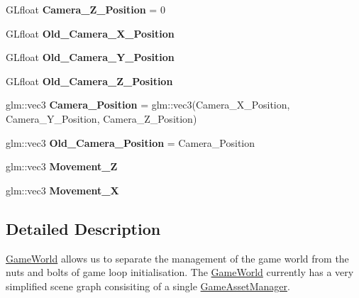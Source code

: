 \begin{DoxyCompactItemize}
\item 
\hypertarget{class_game_world_ad993ea24fbacfc98410894078e916927}{}G\+Lfloat {\bfseries Camera\+\_\+\+Z\+\_\+\+Position} = 0\label{class_game_world_ad993ea24fbacfc98410894078e916927}

\item 
\hypertarget{class_game_world_a734c19bd480aef2a7af005e170d3d523}{}G\+Lfloat {\bfseries Old\+\_\+\+Camera\+\_\+\+X\+\_\+\+Position}\label{class_game_world_a734c19bd480aef2a7af005e170d3d523}

\item 
\hypertarget{class_game_world_ac1c9de2db7cb175f7a039a9f825190fc}{}G\+Lfloat {\bfseries Old\+\_\+\+Camera\+\_\+\+Y\+\_\+\+Position}\label{class_game_world_ac1c9de2db7cb175f7a039a9f825190fc}

\item 
\hypertarget{class_game_world_acf69fc81410f4bb31d03b7551eb0bced}{}G\+Lfloat {\bfseries Old\+\_\+\+Camera\+\_\+\+Z\+\_\+\+Position}\label{class_game_world_acf69fc81410f4bb31d03b7551eb0bced}

\item 
\hypertarget{class_game_world_ad80e597474ea4c52a583e81788187571}{}glm\+::vec3 {\bfseries Camera\+\_\+\+Position} = glm\+::vec3(Camera\+\_\+\+X\+\_\+\+Position, Camera\+\_\+\+Y\+\_\+\+Position, Camera\+\_\+\+Z\+\_\+\+Position)\label{class_game_world_ad80e597474ea4c52a583e81788187571}

\item 
\hypertarget{class_game_world_ade0aa1baaba6ac54674638cef313c0bb}{}glm\+::vec3 {\bfseries Old\+\_\+\+Camera\+\_\+\+Position} = Camera\+\_\+\+Position\label{class_game_world_ade0aa1baaba6ac54674638cef313c0bb}

\item 
\hypertarget{class_game_world_a8dd30ba92e7fa9b9b05075e31d1e7dd8}{}glm\+::vec3 {\bfseries Movement\+\_\+\+Z}\label{class_game_world_a8dd30ba92e7fa9b9b05075e31d1e7dd8}

\item 
\hypertarget{class_game_world_a968eb29424b68f7cd79a5896c62e944d}{}glm\+::vec3 {\bfseries Movement\+\_\+\+X}\label{class_game_world_a968eb29424b68f7cd79a5896c62e944d}

\end{DoxyCompactItemize}


\subsection{Detailed Description}
\hyperlink{class_game_world}{Game\+World} allows us to separate the management of the game world from the nuts and bolts of game loop initialisation. The \hyperlink{class_game_world}{Game\+World} currently has a very simplified scene graph consisiting of a single \hyperlink{class_game_asset_manager}{Game\+Asset\+Manager}. 

